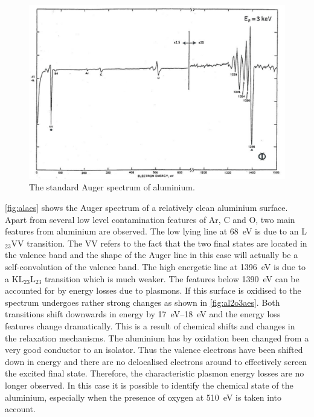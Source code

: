 \begin{figure}[h!]
	\begin{center}
	\includegraphics[scale=4]{figures/06_08.png}
	\caption{The standard Auger spectrum of aluminium.}
	\label{fig:alaes}
	\end{center}
\end{figure}

\autoref{fig:alaes} shows the Auger spectrum of a  relatively clean aluminium surface. Apart from several low level contamination features of Ar, C and O, two main features from aluminium are observed. The low lying line at \SI{68}{\electronvolt} is due to an L$_{23}$VV transition. The VV refers to the fact that the two final states are located in the valence band and the shape of the Auger line in this case will actually be a self-convolution of the valence band. The high energetic line at \SI{1396}{\electronvolt} is due to a KL$_{23}$L$_{23}$ transition which is much weaker. The features below \SI{1390}{\electronvolt} can be accounted for by energy losses due to plasmons. If this surface is oxidised to  the spectrum undergoes rather strong changes as shown in \autoref{fig:al2o3aes}. Both transitions shift downwards in energy by \SIrange{17}{18}{\electronvolt} and the energy loss features change dramatically. This is a result of chemical shifts and changes in the relaxation mechanisms. The aluminium has by oxidation been changed from a very good conductor to an isolator. Thus the valence electrons have been shifted down in energy and there are no delocalised electrons around to effectively screen the excited final state. Therefore, the characteristic plasmon energy losses are no longer observed. In this case it is possible to identify the chemical state of the aluminium, especially when the presence of oxygen at \SI{510}{\electronvolt} is taken into account.

